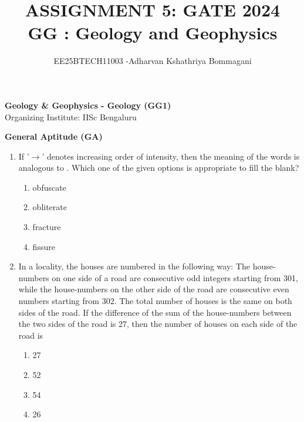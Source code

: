 \documentclass[journal,12pt,onecolumn]{IEEEtran}
\begin{document}
\title{
ASSIGNMENT 5: GATE 2024\\
GG : Geology and Geophysics}
\author{EE25BTECH11003 -Adharvan Kshathriya Bommagani}
\maketitle


\begin{center}
\textbf{Geology \& Geophysics - Geology (GG1)}\\
Organizing Institute: IISc Bengaluru
\end{center}



\textbf{General Aptitude (GA)}






\begin{enumerate}

\item If '$\rightarrow$' denotes increasing order of intensity, then the meaning of the words  is analogous to . Which one of the given options is appropriate to fill the blank?

\hfill{}

\begin{multicols}{4}
\begin{enumerate}
    \item obfuscate
    \item obliterate
    \item fracture
    \item fissure
\end{enumerate}
\end{multicols}

\item In a locality, the houses are numbered in the following way: The house-numbers on one side of a road are consecutive odd integers starting from 301, while the house-numbers on the other side of the road are consecutive even numbers starting from 302. The total number of houses is the same on both sides of the road. If the difference of the sum of the house-numbers between the two sides of the road is 27, then the number of houses on each side of the road is

\hfill{}

\begin{multicols}{4}
\begin{enumerate}
    \item 27
    \item 52
    \item 54
    \item 26
\end{enumerate}
\end{multicols}


\end{enumerate}
\end{document}
